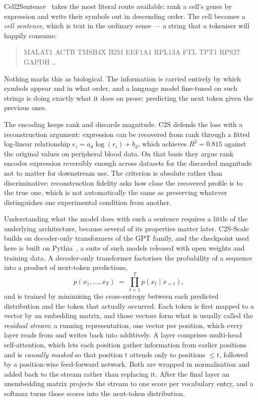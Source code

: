 Cell2Sentence~\cite{c2s} takes the most literal route available: rank a cell's genes by expression
and write their symbols out in descending order. The cell becomes a \emph{cell sentence}, which is
text in the ordinary sense --- a string that a tokeniser will happily consume:

\begin{quote}
\ttfamily\small
MALAT1 ACTB TMSB4X B2M EEF1A1 RPL13A FTL TPT1 RPS27 GAPDH \dots
\end{quote}

\noindent Nothing marks this as biological. The information is carried entirely by which symbols
appear and in what order, and a language model fine-tuned on such strings is doing exactly what it
does on prose: predicting the next token given the previous ones.

The encoding keeps rank and discards magnitude. C2S defends the loss with a reconstruction argument:
expression can be recovered from rank through a fitted log-linear relationship
$e_i = a_d\log(r_i) + b_d$, which achieves $R^2 = 0.815$ against the original values on peripheral
blood data. On that basis they argue rank encodes expression reversibly enough across datasets for
the discarded magnitude not to matter for downstream use. The criterion is absolute rather than
discriminative: reconstruction fidelity asks how close the
recovered profile is to the true one, which is not automatically the same as preserving whatever
distinguishes one experimental condition from another.

Understanding what the model does with such a sentence requires a little of the underlying
architecture, because several of its properties matter later. C2S-Scale builds on decoder-only
transformers of the GPT family, and the checkpoint used here is built on Pythia~\cite{pythia}, a
suite of such models released with open weights and training data. A decoder-only transformer
factorises the probability of a sequence into a product of next-token predictions,
\begin{equation}
  p(x_1, \dots, x_T) \;=\; \prod_{t=1}^{T} p\!\left(x_t \mid x_{<t}\right),
\end{equation}
and is trained by minimising the cross-entropy between each predicted distribution and the token
that actually occurred. Each token is first mapped to a vector by an embedding matrix, and those
vectors form what is usually called the \emph{residual stream}: a running representation, one vector
per position, which every layer reads from and writes back into additively. A layer comprises
multi-head self-attention, which lets each position gather information from earlier positions and is
\emph{causally masked} so that position $t$ attends only to positions $\leq t$, followed by a
position-wise feed-forward network. Both are wrapped in normalisation and added back to the stream
rather than replacing it. After the final layer an unembedding matrix projects the stream to one
score per vocabulary entry, and a softmax turns those scores into the next-token distribution.

